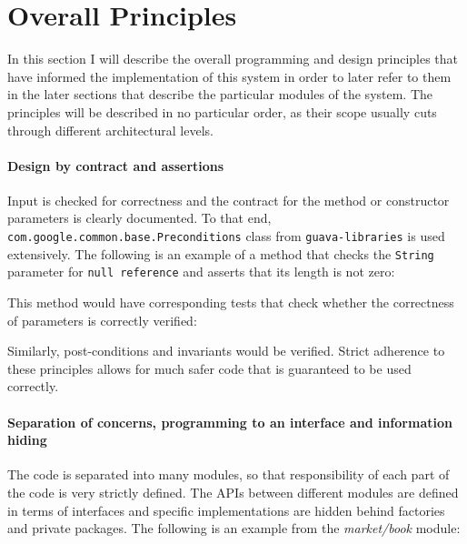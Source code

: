\section{Overall Principles}
\label{Chapters/Implementation/Overall-Principles}
In this section I will describe the overall programming and design principles that have informed the implementation of this system in order to later refer to them in the later sections that describe the particular modules of the system. The principles will be described in no particular order, as their scope usually cuts through different architectural levels.

\paragraph{Design by contract and assertions} 
Input is checked for correctness and the contract for the method or constructor parameters is clearly documented. To that end, \texttt{com.google.common.base.Preconditions} class from \texttt{guava-libraries}\cite{guava} is used extensively. The following is an example of a method that checks the \texttt{String} parameter for \texttt{null reference} and asserts that its length is not zero:


This method would have corresponding tests that check whether the correctness of parameters is correctly verified:


Similarly, post-conditions and invariants would be verified. Strict adherence to these principles allows for much safer code that is guaranteed to be used correctly.

\paragraph{Separation of concerns, programming to an interface and information hiding}
The code is separated into many modules, so that responsibility of each part of the code is very strictly defined. The APIs between different modules are defined in terms of interfaces and specific implementations are hidden behind factories and private packages. The following is an example from the \textit{market/book} module:



